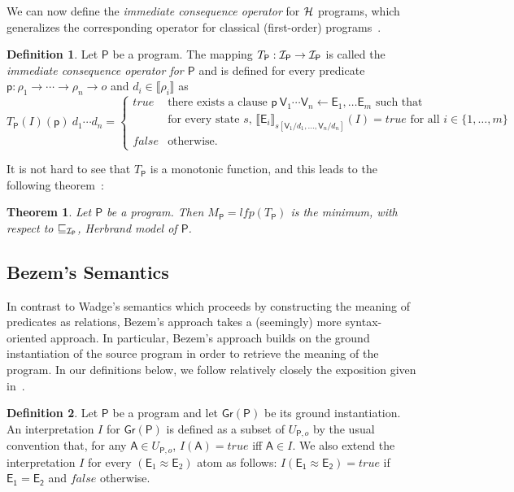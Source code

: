 \documentclass[submission,copyright]{eptcs}
\newtheorem{theorem}{Theorem}
\theoremstyle{definition}
\newtheorem{definition}{Definition}
\newcommand{\mo}[1]{\llbracket#1\rrbracket}
\newcommand{\mwrs}[3]{\llbracket#1\rrbracket_{#3}(#2)}
\newcommand{\aleq}[1][]{\sqsubseteq_{#1}}
\begin{document}
We can now define the {\em immediate consequence operator} for
${\cal H}$ programs, which generalizes the corresponding operator for classical (first-order)
programs~\cite{lloyd}.
\begin{definition}
  Let $\mathsf{P}$ be a program. The mapping $T_\mathsf{P} : {\cal I}_\mathsf{P} \rightarrow {\cal I}_\mathsf{P}$
  is called the {\em immediate consequence operator for $\mathsf{P}$} and is defined for every predicate
  $\mathsf{p} : \rho_1 \rightarrow \cdots \rightarrow \rho_n \rightarrow o$ and $d_i \in \mo{\rho_i}$ as
\[T_\mathsf{P}(I)(\mathsf{p})\ d_1\cdots d_n =
\begin{cases}
  \mathit{true}  & \mbox{there exists a clause $\mathsf{p}\ \mathsf{V}_1\cdots\mathsf{V}_n \leftarrow \mathsf{E}_1, \ldots \mathsf{E}_m$ such that}\\
                 & \mbox{for every state $s$,  $\mwrs{\mathsf{E}_i}{I}{s[\mathsf{V}_1/d_1, \ldots, \mathsf{V}_n/d_n]} = \mathit{true}$ for all $i \in \{1, \ldots, m\}$} \\
  \mathit{false} & \mbox{otherwise.}
\end{cases}
\]
\end{definition}



It is not hard to see that $T_\mathsf{P}$ is a monotonic function, and this leads to
the following theorem~\cite{Wa91a,KRW05}:
\begin{theorem}
Let $\mathsf{P}$ be a program.
Then $M_{\mathsf{P}} =\mathit{lfp}(T_\mathsf{P})$
is the minimum, with respect to $\aleq[{\cal I}_\mathsf{P}]$, Herbrand model of $\mathsf{P}$.
\end{theorem}



\subsection{Bezem's Semantics}
\label{sec:bezemsem}
In contrast to Wadge's semantics which proceeds by constructing the meaning of predicates
as relations, Bezem's approach takes a (seemingly) more syntax-oriented approach. In particular,
Bezem's approach builds on the ground instantiation of the source program in order to
retrieve the meaning of the program. In our definitions below, we follow relatively closely
the exposition given in~\cite{Bezem99,Bezem01,Bezem2002}.
\begin{definition}
Let $\mathsf{P}$ be a program and let $\mathsf{Gr(P)}$ be its ground instantiation.
An interpretation $I$ for $\mathsf{Gr(P)}$ is defined as a subset of $U_{\mathsf{P},o}$
by the usual convention that, for any $\mathsf{A}\in U_{\mathsf{P},o}$, $I(\mathsf{A})=true$
iff $\mathsf{A} \in I$. We also extend the interpretation $I$ for every $(\mathsf{E}_1 \approx \mathsf{E}_2)$
atom as follows: $I(\mathsf{E_1}\approx\mathsf{E_2}) = \mathit{true}$ if $\mathsf{E_1} = \mathsf{E_2}$ and $\mathit{false}$ otherwise.\end{definition}
\end{document}
